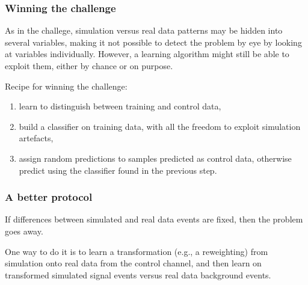 \documentclass{beamer}
\begin{document}
\begin{frame}
  \frametitle{Winning the challenge}

As in the challege, simulation versus real data patterns may be hidden into
several variables, making it not possible to detect the problem by eye by
looking at variables individually. However, a learning algorithm might still be
able to exploit them, either by chance or on purpose.

\vspace{0.5cm}

Recipe for winning the challenge:
\begin{enumerate}
\item learn to distinguish between training and control data,
\item build a classifier on training data, with all the freedom to exploit simulation artefacts,
\item assign random predictions to samples predicted as control data, otherwise predict using the classifier found in the previous step.
\end{enumerate}

\end{frame}

\begin{frame}
  \frametitle{A better protocol}

If differences between simulated and real data events are fixed, then the
problem goes away.

\vspace{1cm}

One way to do it is to {\color{blue} learn a transformation (e.g., a reweighting) from
simulation onto real data from the control channel}, and then learn on
transformed simulated signal events versus real data background events.

\end{frame}
\end{document}

